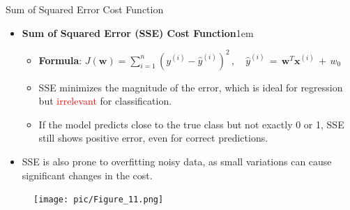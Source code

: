 \documentclass[serif, aspectratio=169]{beamer}
\begin{document}
\begin{frame}{Sum of Squared Error Cost Function}
    \begin{itemize}
        \item \textbf{Sum of Squared Error (SSE) Cost Function}\itemsep1em
        \medskip
        \begin{itemize}\itemsep0.8em
            \item \textbf{Formula}:
                \(
                J(\mathbf{w}) = \sum_{i=1}^{n} (y^{(i)} - \hat{y}^{(i)})^2 \, , \quad \hat{y}^{(i)} \, = \, \mathbf{w}^T\mathbf{x}^{(i)} \, + \, w_0
                \)
            \item \justifying SSE minimizes the magnitude of the error, which is ideal for regression but \textcolor{red}{irrelevant} for classification.
            \item \justifying If the model predicts close to the true class but not exactly 0 or 1, SSE still shows positive error, even for correct predictions.
        \end{itemize}
    \end{itemize}
    \begin{itemize}
        \item SSE is also prone to overfitting noisy data, as small variations can cause significant changes in the cost.
    \end{itemize}
    \endminipage
        \begin{figure}
            \centering
            \texttt{[image: pic/Figure\_11.png]}
        \end{figure}
    \endminipage
    \vfill
\end{frame}
\end{document}
